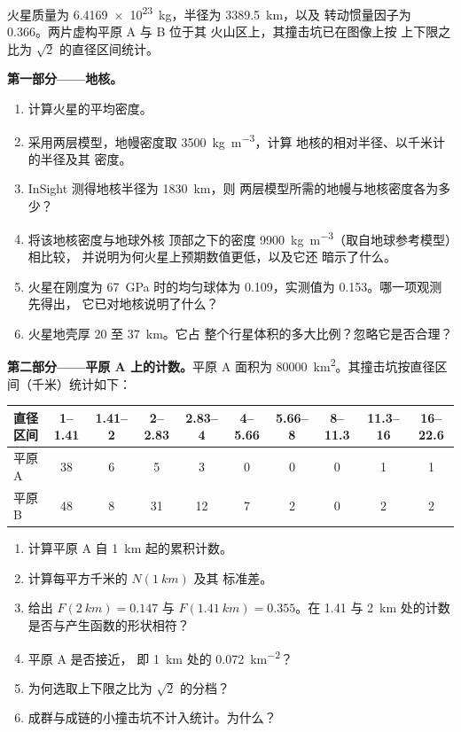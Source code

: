 \begin{problem}
\label{pb:b3:planetary-interiors-surfaces:1}
火星质量为 \qty{6.4169e23}{kg}，半径为 \qty{3389.5}{km}，以及
转动惯量因子为 0.366。两片虚构平原 A 与 B 位于其
火山区上，其撞击坑已在图像上按
上下限之比为 $\sqrt2$ 的直径区间统计。

\medskip\noindent\textbf{第一部分——地核。}
\begin{enumerate}
\item 计算火星的平均密度。
\item 采用两层模型，地幔密度取 \qty{3500}{kg.m^{-3}}，计算
  地核的相对半径、以千米计的半径及其
  密度。
\item InSight 测得地核半径为 \qty{1830}{km}，则
  两层模型所需的地幔与地核密度各为多少？
\item 将该地核密度与地球外核
  顶部之下的密度 \qty{9900}{kg.m^{-3}}（取自地球参考模型）相比较，
  并说明为何火星上预期数值更低，以及它还
  暗示了什么。
\item 火星在刚度为
  \qty{67}{GPa} 时的均匀球体为 0.109，实测值为 0.153。哪一项观测先得出，
  它已对地核说明了什么？
\item 火星地壳厚 20 至 \qty{37}{km}。它占
  整个行星体积的多大比例？忽略它是否合理？
\end{enumerate}

\medskip\noindent\textbf{第二部分——平原 A 上的计数。}平原 A
面积为 \qty{80000}{km^2}。其撞击坑按直径区间（千米）统计如下：
\begin{center}
\small
\begin{tabular}{lccccccccc}
\hline
直径区间 & 1--1.41 & 1.41--2 & 2--2.83 & 2.83--4 & 4--5.66 & 5.66--8 & 8--11.3 & 11.3--16 & 16--22.6 \\
\hline
平原 A & 38 & 6 & 5 & 3 & 0 & 0 & 0 & 1 & 1 \\
平原 B & 48 & 8 & 31 & 12 & 7 & 2 & 0 & 2 & 2 \\
\hline
\end{tabular}
\end{center}
\begin{enumerate}[resume]
\item 计算平原 A 自 \qty{1}{km} 起的累积计数。
\item 计算每平方千米的 $N(\qty{1}{km})$ 及其
  标准差。
\item {}给出 $F(\qty{2}{km}) = 0.147$ 与
  $F(\qty{1.41}{km}) = 0.355$。在 1.41 与 \qty{2}{km} 处的计数
  是否与产生函数的形状相符？
\item 平原 A 是否接近，
  即 \qty{1}{km} 处的 \qty{0.072}{km^{-2}}？
\item 为何选取上下限之比为 $\sqrt2$ 的分档？
\item 成群与成链的小撞击坑不计入统计。为什么？
\end{enumerate}


\end{problem}
